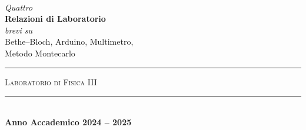 \begin{titlingpage}
\begin{center}
        \\[20pt]
        {\large\itshape Quattro}
        \\[5pt]
        {\Huge\bfseries Relazioni di Laboratorio}
        \\[3pt]
        {\large\textit{brevi su}\\Bethe--Bloch, Arduino, Multimetro,\\Metodo Montecarlo}
        \\
        \vfill
        \centering
        \begin{minipage}[h]{0.4\textwidth}
            \centering
            \hrule
            \vspace{10pt}
            \textsc{Laboratorio di Fisica III}
            \vspace{10pt}
            \hrule
        \end{minipage}
        \\[50pt]
        \vspace{\fill}
        \vspace{30pt}
        \doublerule
        \vspace{10pt}
        \normalsize
        \textbf{Anno Accademico 2024 -- 2025}
    \end{center}
\end{titlingpage}
\restoregeometry
